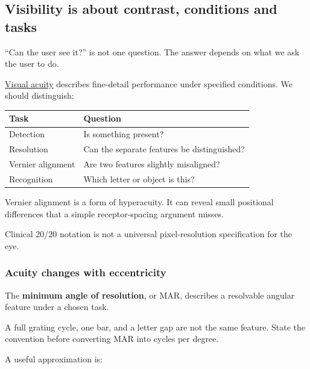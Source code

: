 \subsection{Visibility is about contrast, conditions and tasks}\label{04-visual-computing-ii-ch042-visibility-is-about-contrast-conditions-and-tasks}

\hypertarget{04-visual-computing-ii-ch042-visibility-is-about-contrast-conditions-and-tasks}{}

``Can the user see it?'' is not one question. The answer depends on what we ask the user to do.

\hyperref[appendix-b491fc48c54b]{Visual acuity} describes fine-detail performance under specified conditions. We should distinguish:

{\def\LTcaptype{none} %
\begin{longtable}[]{@{}ll@{}}
\toprule\noalign{}
Task & Question \\
\midrule\noalign{}
\endhead
\bottomrule\noalign{}
\endlastfoot
Detection & Is something present? \\
Resolution & Can the separate features be distinguished? \\
Vernier alignment & Are two features slightly misaligned? \\
Recognition & Which letter or object is this? \\
\end{longtable}
}

Vernier alignment is a form of hyperacuity. It can reveal small positional differences that a simple receptor-spacing argument misses.

Clinical 20/20 notation is not a universal pixel-resolution specification for the eye.

\subsubsection{Acuity changes with eccentricity}\label{04-visual-computing-ii-ch042-acuity-changes-with-eccentricity}

\hypertarget{04-visual-computing-ii-ch042-acuity-changes-with-eccentricity}{}

The \textbf{minimum angle of resolution}, or MAR, describes a resolvable angular feature under a chosen task.

A full grating cycle, one bar, and a letter gap are not the same feature. State the convention before converting MAR into cycles per degree.

A useful approximation is:

